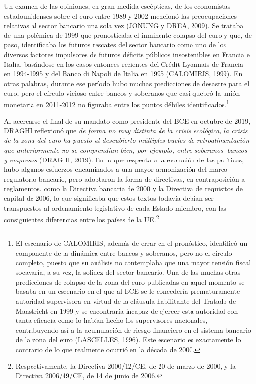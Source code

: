 \documentclass[10pt,a4paper]{article}
\begin{document}
{Un examen de las opiniones, en gran medida escépticas, de los economistas estadounidenses sobre el euro entre 1989 y 2002 mencionó las preocupaciones relativas al sector bancario una sola vez (JONUNG y DREA, 2009). Se trataba de una polémica de 1999 que pronosticaba el inminente colapso del euro y que, de paso, identificaba los futuros rescates del sector bancario como uno de los diversos factores impulsores de futuros déficits públicos insostenibles en Francia e Italia, basándose en los casos entonces recientes del Crédit Lyonnais de Francia en 1994-1995 y del Banco di Napoli de Italia en 1995 (CALOMIRIS, 1999). En otras palabras, durante ese período hubo muchas predicciones de desastre para el euro, pero el círculo vicioso entre bancos y soberanos que casi quebró la unión monetaria en 2011-2012 no figuraba entre los puntos débiles identificados.\footnote{%
    El escenario de CALOMIRIS, además de errar en el pronóstico, identificó un componente de la dinámica entre bancos y soberanos, pero no el círculo completo, puesto que su análisis no contemplaba que una mayor tensión fiscal socavaría, a su vez, la solidez del sector bancario. Una de las muchas otras predicciones de colapso de la zona del euro publicadas en aquel momento se basaba en un escenario en el que al BCE se le concedería prematuramente autoridad supervisora en virtud de la cláusula habilitante del Tratado de Maastricht en 1999 y se encontraría incapaz de ejercer esta autoridad con tanta eficacia como lo habían hecho los supervisores nacionales, contribuyendo así a la acumulación de riesgo financiero en el sistema bancario de la zona del euro (LASCELLES, 1996). Este escenario es exactamente lo contrario de lo que realmente ocurrió en la década de 2000.
}

Al acercarse el final de su mandato como presidente del BCE en octubre de 2019, DRAGHI reflexionó que \textit{de forma no muy distinta de la crisis ecológica, la crisis de la zona del euro ha puesto al descubierto múltiples bucles de retroalimentación que anteriormente no se comprendían bien, por ejemplo, entre soberanos, bancos y empresas} (DRAGHI, 2019). En lo que respecta a la evolución de las políticas, hubo algunos esfuerzos encaminados a una mayor armonización del marco regulatorio bancario, pero adoptaron la forma de directivas, en contraposición a reglamentos, como la Directiva bancaria de 2000 y la Directiva de requisitos de capital de 2006, lo que significaba que estos textos todavía debían ser transpuestos al ordenamiento legislativo de cada Estado miembro, con las consiguientes diferencias entre los países de la UE.\footnote{%
    Respectivamente, la Directiva 2000/12/CE, de 20 de marzo de 2000, y la Directiva 2006/49/CE, de 14 de junio de 2006.
}


}
\end{document}
